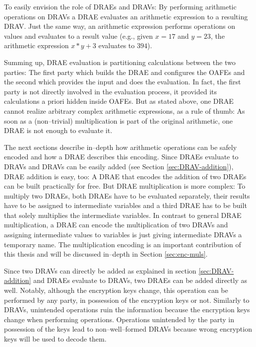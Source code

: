 To easily envision the role of DRAEs and DRAVs: By performing arithmetic
operations on DRAVs a DRAE evaluates an arithmetic expression to a resulting
DRAV\@. Just the same way, an arithmetic expression performs operations on
values and evaluates to a result value (e.g., given $x=17$ and $y=23$, the
arithmetic expression $x*y + 3$ evaluates to $394$).

Summing up, DRAE evaluation is partitioning calculations between the two
parties: The first party which builds the DRAE and configures the OAFEs and the
second which provides the input and does the evaluation. In fact, the first
party is not directly involved in the evaluation process, it provided its
calculations a priori hidden inside OAFEs. But as stated above, one DRAE cannot
realize arbitrary complex arithmetic expressions, as a rule of thumb: As soon as
a (non--trivial) multiplication is part of the original arithmetic, one DRAE is
not enough to evaluate it.

The next sections describe in--depth how arithmetic operations can be safely
encoded and how a DRAE describes this encoding. Since DRAEs evaluate to DRAVs
and DRAVs can be easily added (see Section \ref{sec:DRAV-addition}), DRAE
addition is easy, too: A DRAE that encodes the addition of two DRAEs can be
built practically for free. But DRAE multiplication is more complex: To multiply
two DRAEs, both DRAEs have to be evaluated separately, their results have to be
assigned to intermediate variables and a third DRAE has to be built that solely
multiplies the intermediate variables. In contrast to general DRAE
multiplication, a DRAE can encode the multiplication of two DRAVs and assigning
intermediate values to variables is just giving intermediate DRAVs a temporary
name. The multiplication encoding is an important contribution of this thesis
and will be discussed in--depth in Section \ref{sec:enc-muls}.


\label{sec:enc-adds}

Since two DRAVs can directly be added as explained in section
\ref{sec:DRAV-addition} and DRAEs evaluate to DRAVs, two DRAEs can be added
directly as well. Notably, although the encryption keys change, this operation
can be performed by any party, in possession of the encryption keys or not.
Similarly to DRAVs, unintended operations ruin the information because the
encryption keys change when performing operations. Operations unintended by the
party in possession of the keys lead to non--well--formed DRAVs because wrong
encryption keys will be used to decode them.


